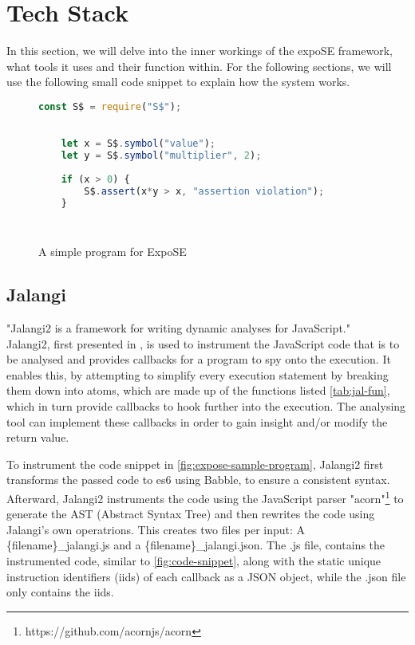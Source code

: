 \section{Tech Stack}
\label{sec:tech}
In this section, we will delve into the inner workings of the expoSE framework, what tools it uses and their function within. 
For the following sections, we will use the following small code snippet to explain how the system works. 


\begin{figure}[h]
    \begin{lstlisting}[language=JavaScript, gobble=4]
    const S$ = require("S$");
    

    let x = S$.symbol("value"); 
    let y = S$.symbol("multiplier", 2);
    
    if (x > 0) {
        S$.assert(x*y > x, "assertion violation"); 
    }
    
   
    \end{lstlisting}
    \caption{A simple program for ExpoSE}
    \label{fig:expose-sample-program}
\end{figure}



\subsection{Jalangi}
\label{sec:jalangi}
"Jalangi2 is a framework for writing dynamic analyses for JavaScript." \cite{noauthor_samsungjalangi2_nodate}\\
Jalangi2, first presented in \citet{sen_jalangi_2013}, is used to instrument the JavaScript code that is to be analysed and provides callbacks for a program to spy onto the execution.
It enables this, by attempting to simplify every execution statement by breaking them down into atoms, which are made up of the functions listed \autoref{tab:jal-fun}, which in turn provide callbacks to hook further into the execution.
The analysing tool can implement these callbacks in order to gain insight and/or modify the return value.


To instrument the code snippet in \autoref{fig:expose-sample-program}, Jalangi2 first transforms the passed code to es6 using Babble, to ensure a consistent syntax. 
Afterward, Jalangi2 instruments the code using the JavaScript parser "acorn"\footnote{https://github.com/acornjs/acorn} to generate the AST (Abstract Syntax Tree) and then rewrites the code using Jalangi's own operatrions. This creates two files per input: 
A \{filename\}\_jalangi.js and a \{filename\}\_jalangi.json. The .js file, contains the instrumented code, similar to \autoref{fig:code-snippet}, along with the static unique instruction identifiers (iids) of each callback as a JSON object, while the .json file only contains the iids.

